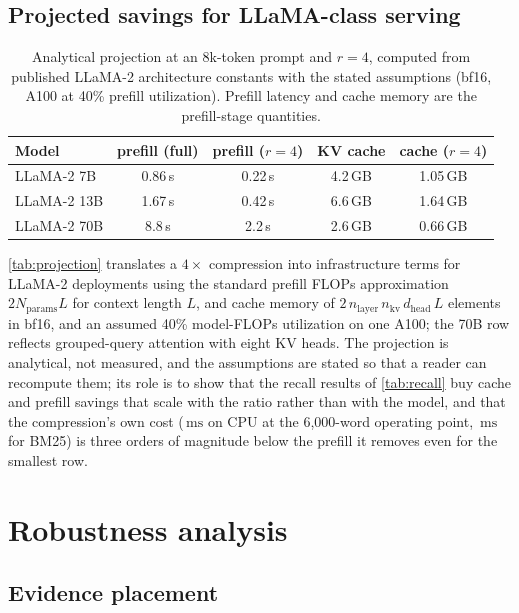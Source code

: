 \documentclass[preprint,12pt]{elsarticle}
\theoremstyle{remark}
\newcommand{\ms}{\ensuremath{\mathrm{ms}}}
\begin{document}
\subsection{Projected savings for LLaMA-class serving}
\label{sec:projection}

\begin{table}[t]
\centering
\caption{Analytical projection at an 8k-token prompt and $r=4$,
computed from published LLaMA-2 architecture constants with the
stated assumptions (bf16, A100 at 40\% prefill utilization). Prefill
latency and cache memory are the prefill-stage quantities.}
\label{tab:projection}
\small
\begin{tabular}{lcccc}
\toprule
Model & prefill (full) & prefill ($r=4$) & KV cache & cache ($r=4$) \\
\midrule
LLaMA-2 7B & 0.86\,s & 0.22\,s & 4.2\,GB & 1.05\,GB \\
LLaMA-2 13B & 1.67\,s & 0.42\,s & 6.6\,GB & 1.64\,GB \\
LLaMA-2 70B & 8.8\,s & 2.2\,s & 2.6\,GB & 0.66\,GB \\
\bottomrule
\end{tabular}
\end{table}

\autoref{tab:projection} translates a $4\times$ compression into
infrastructure terms for LLaMA-2 deployments \citep{touvron2023llama}
using the standard prefill FLOPs approximation $2N_{\mathrm{params}}
L$ for context length $L$, and cache memory of
$2\,n_{\mathrm{layer}}\,n_{\mathrm{kv}}\,d_{\mathrm{head}}\,L$
elements in bf16, and an assumed 40\% model-FLOPs utilization on one
A100; the 70B row reflects grouped-query attention with eight KV
heads. The projection is analytical, not measured, and the
assumptions are stated so that a reader can recompute them; its role
is to show that the recall results of \autoref{tab:recall} buy cache
and prefill savings that scale with the ratio rather than with the
model, and that the compression's own cost (\TimeSieSixk\,\ms{} on
CPU at the 6{,}000-word operating point, \TimeBmSixk\,\ms{} for BM25)
is three orders of magnitude below the prefill it removes even for
the smallest row.

\section{Robustness analysis}
\label{sec:robustness}

\subsection{Evidence placement}
\label{sec:placement}
\end{document}
